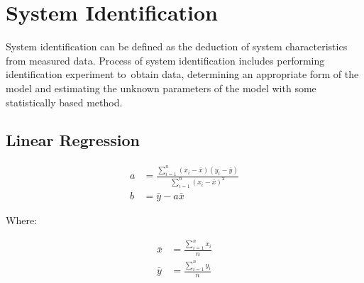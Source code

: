 \chapter{System Identification}

System identification can be defined as the deduction of system characteristics from measured data. \cite{NASA-RP-1138} Process of system identification includes performing identification experiment to obtain data, determining an appropriate form of the model and estimating the unknown parameters of the model with some statistically based method. \cite{SoderstromStoica1989}

\section{Linear Regression}

\begin{align}
  a &= \frac{\sum_{i=1}^{n}{ \left( x_i - \bar{x} \right) \left( y_i - \bar{y} \right) }}{\sum_{i=1}^{n}{ \left( x_i - \bar{x} \right)^2 }} \\
  b &= \bar y - a \bar x
\end{align}

Where:

\begin{align}
  \bar{x} &= \frac{\sum_{i=1}^{n}{ x_i }}{ n } \\
  \bar{y} &= \frac{\sum_{i=1}^{n}{ y_i }}{ n }
\end{align}
